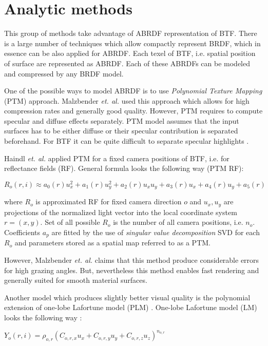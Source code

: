  \section{Analytic methods}
\label{section:analytic_methods}	
 This group of methods take advantage of ABRDF representation of BTF. 
 There is a large number of techniques which allow compactly represent BRDF, which in essence can be also applied for ABRDF.
 Each texel of BTF, i.e. spatial position of surface are represented as ABRDF. Each of these ABRDFs can be modeled and compressed by any BRDF model.
 
One of the possible ways to model ABRDF is to use \emph{Polynomial Texture  Mapping} (PTM) approach.
Malzbender  \emph{et. al.} \cite{PTM} used this approach which allows for high compression rates and generally good quality. 
However, PTM requires to compute specular and diffuse effects separately. 
PTM model assumes that the input surfaces has to be either diffuse or their specular contribution is separated beforehand.
For BTF it can be quite difficult to separate specular highlights \cite{haindl}.

Haindl  \emph{et. al.} \cite{haindl} applied PTM for a fixed camera positions of BTF, i.e. for reflectance fields (RF).
General formula looks the following way (PTM RF):

{\centering$R_{o}(r,i)\approx a_{0}(r)u_{x}^2+a_{1}(r)u_{y}^2+a_{2}(r)u_{x}u_{y}+a_{3}(r)u_{x}+a_{4}(r)u_{y}+a_{5}(r)$\\}

 where $R_{o}$ is approximated RF for fixed camera direction $o$ and $u_{x},u_{y}$ are projections of the normalized light vector into the local coordinate system $r=(x,y)$.
 Set of all possible $R_{o}$ is the number of all camera positions, i.e. $n_{o}$. 
 Coefficients $a_{p}$ are fitted by the use of \emph{singular value decomposition} SVD for each $R_{o}$ and parameters stored as a spatial map referred to as a PTM.
 
 However, Malzbender  \emph{et. al.} \cite{PTM} claims that this method produce considerable errors for high grazing angles. 
 But, nevertheless this method enables fast rendering and generally suited for smooth material surfaces.
 
 Another model which produces slightly better visual quality is the polynomial extension of one-lobe Lafortune model (PLM) \cite{haindl}.
One-lobe Lafortune model (LM) looks the following way \cite{plm}:

{\centering$Y_{o} (r,i) = \rho_{o,r}(C_{o,r,x}u_{x}+C_{o,r,y}u_{y}+C_{o,r,z}u_{z})_{ }^{n_{o,r}}$\\}

